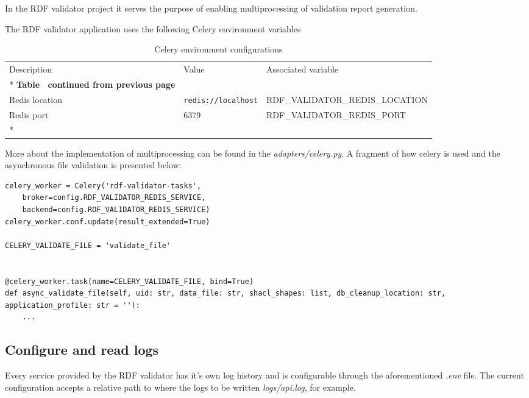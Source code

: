 In the RDF validator project it serves the purpose of enabling multiprocessing of validation report generation.

The RDF validator application uses the following Celery environment variables

\begin{longtable}[c]{@{}p{3.5cm}p{3.5cm}l@{}}
	\toprule
	Description    & Value                      & Associated variable             \\* \midrule
	\endfirsthead
	\multicolumn{3}{c}%
	{{\bfseries Table \thetable\ continued from previous page}}                   \\
	\endhead
	\bottomrule
	\endfoot
	\endlastfoot
	Redis location & \texttt{redis://localhost} & RDF\_VALIDATOR\_REDIS\_LOCATION \\
	Redis port     & 6379                       & RDF\_VALIDATOR\_REDIS\_PORT     \\*\bottomrule
	\caption{Celery environment configurations}
	\label{tab:validator-celery-env}                                              \\
\end{longtable}

More about the implementation of multiprocessing can be found in the \textit{adapters/celery.py}. A fragment of how celery is used and the asynchronous file validation is presented below:

\begin{lstlisting}
celery_worker = Celery('rdf-validator-tasks',
	broker=config.RDF_VALIDATOR_REDIS_SERVICE,
	backend=config.RDF_VALIDATOR_REDIS_SERVICE)
celery_worker.conf.update(result_extended=True)

CELERY_VALIDATE_FILE = 'validate_file'


@celery_worker.task(name=CELERY_VALIDATE_FILE, bind=True)
def async_validate_file(self, uid: str, data_file: str, shacl_shapes: list, db_cleanup_location: str, application_profile: str = ''):
	...
\end{lstlisting}

\subsection{Configure and read logs}
Every service provided by the RDF validator has it's own log history and is configurable through the aforementioned \textit{.env} file. The current configuration accepts a relative path to where the logs to be written \textit{logs/api.log}, for example.

